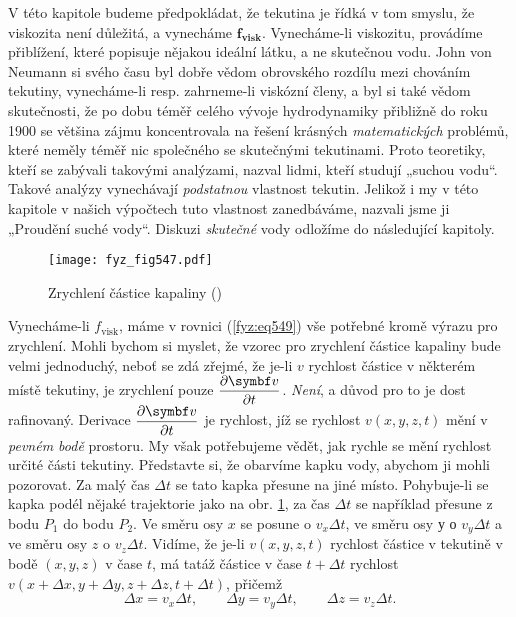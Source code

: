 {    V této kapitole budeme předpokládat, že tekutina je řídká v tom smyslu, že viskozita není 
    důležitá, a vynecháme \(\bm{f_{\text{visk}}}\). Vynecháme-li viskozitu, provádíme 
    přiblížení, které popisuje nějakou ideální látku, a ne skutečnou vodu. John von Neumann si 
    svého času byl dobře vědom obrovského rozdílu mezi chováním tekutiny, vynecháme-li resp. 
    zahrneme-li viskózní členy, a byl si také vědom skutečnosti, že po dobu téměř celého vývoje 
    hydrodynamiky přibližně do roku \num{1900} se většina zájmu koncentrovala na řešení krásných 
    \emph{matematických} problémů, které neměly téměř nic společného se skutečnými tekutinami. 
    Proto teoretiky, kteří se zabývali takovými analýzami, nazval lidmi, kteří studují „suchou 
    vodu“. Takové analýzy vynechávají \emph{podstatnou} vlastnost tekutin. Jelikož i my v této 
    kapitole v našich výpočtech tuto vlastnost zanedbáváme, nazvali jsme ji „Proudění suché vody“. 
    Diskuzi \emph{skutečné} vody odložíme do následující kapitoly.
    
    \begin{figure}[ht!] %
      \centering
      \texttt{[image: fyz\_fig547.pdf]}
      \caption{Zrychlení částice kapaliny
               (\cite[s.~744]{Feynman02})}
      \label{fyz_fig547}
    \end{figure}
    
    Vynecháme-li \(f_{\text{visk}}\), máme v rovnici (\ref{fyz:eq549}) vše potřebné kromě výrazu 
    pro zrychlení. Mohli bychom si myslet, že vzorec pro zrychlení částice kapaliny bude velmi 
    jednoduchý, neboť se zdá zřejmé, že je-li \(v\) rychlost částice v některém místě tekutiny, je 
    zrychlení pouze \(\pder{\bm{v}}{t}\). \emph{Není}, a důvod pro to je dost rafinovaný. Derivace 
    \(\pder{\bm{v}}{t}\) je rychlost, jíž se rychlost \(v(x, y, z, t)\) mění v \emph{pevném bodě} 
    prostoru. My však potřebujeme vědět, jak rychle se mění rychlost určité části tekutiny. 
    Představte si, že obarvíme kapku vody, abychom ji mohli pozorovat. Za malý čas \(\Delta t\) se 
    tato kapka přesune na jiné místo. Pohybuje-li se kapka podél nějaké trajektorie jako na obr. 
    \ref{fyz_fig547}, za čas \(\Delta t\) se například přesune z bodu \(P_1\) do bodu \(P_2\). Ve 
    směru osy \(x\) se posune o \(v_x\Delta t\), ve směru osy \(у\) о \(v_y\Delta t\) a ve směru 
    osy \(z\) o \(v_z\Delta t\). Vidíme, že je-li \(v(x, y, z, t)\) rychlost částice v tekutině v 
    bodě \((x, y, z)\) v čase \(t\), má tatáž částice v čase \(t + \Delta t\) rychlost \(v(x+ 
    \Delta x, y + \Delta y, z + \Delta z, t + \Delta t)\), přičemž
    \begin{equation*}
      \Delta x = v_x\Delta t, \qquad  \Delta y = v_y\Delta t, \qquad  \Delta z = v_z\Delta t.
    \end{equation*}
    
}
